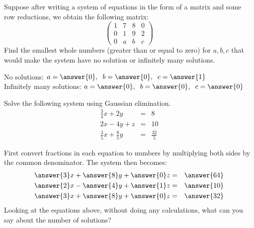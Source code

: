 \documentclass{ximera}
\begin{document}
\begin{exercise}
Suppose after writing a system of equations in the form of a matrix and some row reductions, we obtain the following matrix:
\[
\left(\begin{array}{ccc|c}
  1 &  7 & 8 &0 \\
   0&  1 & 9 & 2\\
  0 &  a & b & c
\end{array}\right)
\]
Find the smallest whole numbers (greater than or equal to zero) for $a,b,c$ that would make the system have no solution or infinitely many solutions.\\

\begin{prompt}

No solutions: $a= \answer{0}, \hspace{.2cm} b = \answer{0}, \hspace{.2cm} c= \answer{1}$\\

Infinitely many solutions: $a= \answer{0}, \hspace{.2cm} b= \answer{0}, \hspace{.2cm} c= \answer{0}$
\end{prompt}
\end{exercise}
\begin{exercise}

Solve the following system using Gaussian elimination.
\begin{eqnarray*}
\frac{3}{4}x+2y&=& 8\\
2x-4y+z &=& 10\\
\frac{3}{5}x+\frac{8}{5}y&=& \frac{32}{5}
\end{eqnarray*}
\begin{prompt}
First convert fractions in each equation to numbers by multiplying both sides by the common denominator. The system then becomes:
\begin{eqnarray*}
\answer{3}x +\answer{8}y + \answer{0} z &=& \answer{64}\\
\answer{2}x - \answer{4}y +\answer{1}z &=& \answer{10}\\
\answer{3}x + \answer{8}y +\answer{0}z &=& \answer{32}
\end{eqnarray*}
Looking at the equations above, without doing any calculations, what can you say about the number of solutions?
\begin{multipleChoice}
\end{multipleChoice}
\end{prompt}


\end{exercise}
\end{document}
